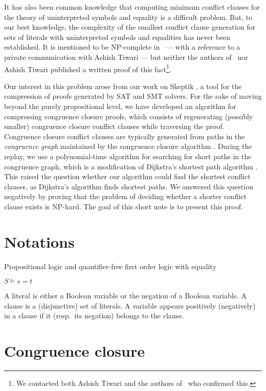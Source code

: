 \documentclass{easychair}
\begin{document}
It has also been common knowledge that computing minimum conflict clauses for
the theory of uninterpreted symbols and equality is a difficult problem.  But,
to our best knowledge, the complexity of the smallest conflict clause generation
for sets of literals with uninterpreted symbols and equalities has never been
established.  It is mentioned to be NP-complete in~\cite{Nieuwenhuis8} --- with
a reference to a private communication with Ashish Tiwari --- but neither the
authors of~\cite{Nieuwenhuis8} nor Ashish Tiwari published a written proof of
this fact\footnote{We contacted both Ashish Tiwari and the authors
  of~\cite{Nieuwenhuis8} who confirmed this.}.

Our interest in this problem arose from our work on Skeptik \cite{Boudou1}, a tool for the compression of proofs generated by SAT and SMT solvers. For the sake of moving beyond the purely propositional level, we have developed an algorithm for compressing congruence closure proofs, which consists of regenerating (possibly smaller) congruence closure conflict clauses while traversing the proof. Congruence closure conflict clauses are typically generated from paths in the \emph{congruence graph} maintained by the congruence closure algorithm \cite{Fontaine2004,Nieuwenhuis6,Nieuwenhuis9}. During the replay, we use a polynomial-time algorithm for searching for short paths in the congruence graph, which is a modification of Dijkstra's shortest path algorithm \cite{Dijkstra1959}. This raised the question whether our algorithm could find the shortest conflict clauses, as Dijkstra's algorithm finds shortest paths. We answered this question negatively by proving that the problem of deciding whether a shorter conflict clause exists is NP-hard. The goal of this short note is to present this proof.



\section*{Notations}

Propositional logic and quantifier-free first order logic with equality

$S \models s=t$

A literal is either a Boolean variable or the negation of a Boolean variable.
A clause is a (disjunctive) set of literals.  A variable appears positively (negatively) in a clause if it (resp.\ its negation) belongs to the clause.

\section*{Congruence closure}
\end{document}
